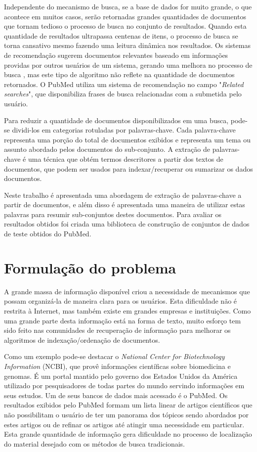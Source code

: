 Independente do mecanismo de busca, se a base de dados for muito grande, o que acontece em muitos casos, serão retornadas grandes quantidades de documentos que tornam tedioso o processo de busca no conjunto de resultados. Quando esta quantidade de resultados ultrapassa centenas de itens, o processo de busca se torna cansativo mesmo fazendo uma leitura dinâmica nos resultados. Os sistemas de recomendação sugerem documentos relevantes baseado em informações providas por outros usuários de um sistema, gerando uma melhora no processo de busca \cite{Jannach2010}, mas este tipo de algoritmo não reflete na quantidade de documentos retornados. O PubMed utiliza um sistema de recomendação no campo "\emph{Related searches}", que disponibiliza frases de busca relacionadas com a submetida pelo usuário.

Para reduzir a quantidade de documentos disponibilizados em uma busca, pode-se dividi-los em categorias rotuladas por palavras-chave. Cada palavra-chave representa uma porção do total de documentos exibidos e representa um tema ou assunto abordado pelos documentos do sub-conjunto. A extração de palavras-chave é uma técnica que obtém termos descritores a partir dos textos de documentos, que podem ser usados para indexar/recuperar ou sumarizar os dados documentos.

Neste trabalho é apresentada uma abordagem de extração de palavras-chave a partir de documentos, e além disso é apresentada uma maneira de utilizar estas palavras para resumir sub-conjuntos destes documentos. Para avaliar os resultados obtidos foi criada uma biblioteca de construção de conjuntos de dados de teste obtidos do PubMed.

\section{Formulação do problema}
A grande massa de informação disponível criou a necessidade de mecanismos que possam organizá-la de maneira clara para os usuários. Esta dificuldade não é restrita à Internet, mas também existe em grandes empresas e instituições. Como uma grande parte desta informação está na forma de texto, muito esforço tem sido feito nas comunidades de recuperação de informação para melhorar os algoritmos de indexação/ordenação de documentos.

Como um exemplo pode-se destacar o \emph{National Center for Biotechnology Information} (NCBI), que provê informações científicas sobre biomedicina e genomas. É um  portal mantido pelo governo dos Estados Unidos da América utilizado por pesquisadores de todas partes do mundo servindo informações em seus estudos. Um de seus bancos de dados mais acessado é o PubMed. Os resultados exibidos pelo PubMed formam um lista linear de artigos científicos que não possibilitam o usuário de ter um panorama dos tópicos sendo abordados por estes artigos ou de refinar os artigos até atingir uma necessidade em particular. Esta grande quantidade de informação gera dificuldade no processo de localização do material desejado com os métodos de busca tradicionais.

